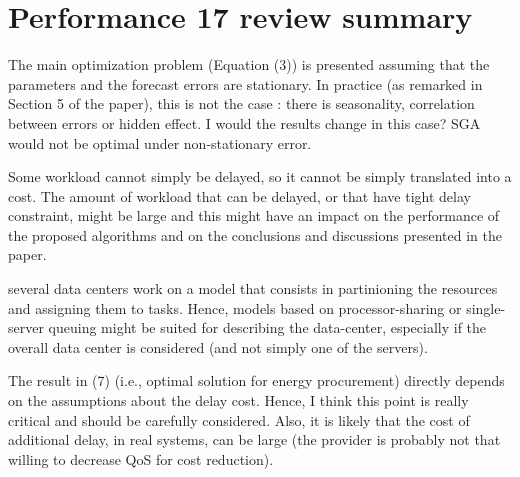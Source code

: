 \section{Performance 17 review summary}

The main optimization problem (Equation (3)) is presented assuming that the parameters and the forecast errors are stationary. In practice (as remarked in Section 5 of the
paper), this is not the case : there is seasonality, correlation between errors or hidden effect. I would the results change in this case?  SGA would not be optimal under non-stationary error.

Some workload cannot simply be delayed, so it cannot be simply translated into a cost. The amount of workload that can be delayed, or that have tight delay constraint, might be large and this might have an impact on the performance of the proposed algorithms and on the conclusions and discussions presented in the paper. 

several data centers work on a model that consists in partinioning the resources and assigning them to tasks. Hence, models based on processor-sharing or single-server queuing might be suited for describing the data-center, especially if the overall data center is considered (and not simply one of the servers).   

The result in (7) (i.e., optimal solution for energy procurement) directly depends on the assumptions about the delay cost. Hence, I think this point is really critical and should be carefully considered.
Also, it is likely that the cost of additional delay, in real systems, can be large (the provider is probably not that willing to decrease QoS for cost reduction). 

